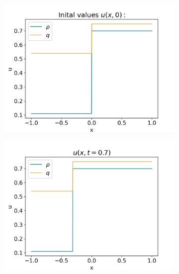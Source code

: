 \documentclass[10pt]{article}
\numberwithin{equation}{section}
\begin{document}
\begin{figure}[H]
     \centering
     \begin{subfigure}[t]{0.35\textwidth}
         \centering
         \includegraphics[width=\textwidth]{Figures/Model/Sys2aIV.png}
     \end{subfigure}
     \begin{subfigure}[t]{0.35\textwidth}
         \centering
         \includegraphics[width=\textwidth]{Figures/Model/Sys2aAtTime.png}
     \end{subfigure}
     \hfill 
     \begin{subfigure}[b]{0.35\textwidth}
         \centering

\end{subfigure}
\end{figure}
\end{document}
